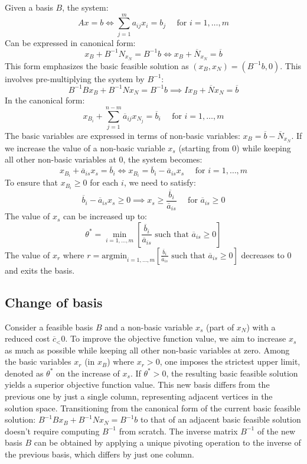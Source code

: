 Given a basis $B$, the system:
\[Ax=b \Leftrightarrow \sum_{j=1}^{m}a_{ij}x_i=b_j \:\:\:\:\:\: \text{for }i=1,\dots,m\]
Can be expressed in canonical form: 
\[x_B+B^{-1}N_{x_N}=B^{-1}b \Leftrightarrow x_B+\overline{N}_{x_N}=\overline{b}\]
This form emphasizes the basic feasible solution as $(x_B,x_N)=(B^{-1}b,0)$. 
This involves pre-multiplying the system by $B^{-1}$: 
\[B^{-1}Bx_B+B^{-1}Nx_N=B^{-1}b \implies Ix_B+\overline{N}x_N=\overline{b}\]
In the canonical form: 
\[x_{B_i}+\sum_{j=1}^{n-m}\overline{a}_{ij}x_{N_j}=\overline{b}_i \:\:\:\:\:\: \text{for }i=1,\dots,m\]
The basic variables are expressed in terms of non-basic variables: $x_B=\overline{b}-\overline{N}_{x_N}$. 
If we increase the value of a non-basic variable $x_s$ (starting from 0) while keeping all other non-basic variables at 0, the system becomes: 
\[x_{B_i}+\overline{a}_{is}x_s=\overline{b}_i \Leftrightarrow x_{B_i}=\overline{b}_i-\overline{a}_{is}x_s \:\:\:\:\:\: \text{for }i=1,\dots,m\]
To ensure that $x_{B_i} \geq 0$ for each $i$, we need to satisfy: 
\[\overline{b}_i-\overline{a}_{is}x_s \geq 0 \implies x_s \geq \dfrac{\overline{b}_i}{\overline{a}_{is}} \:\:\:\:\:\: \text{for }\overline{a}_{is} \geq 0\]
The value of $x_s$ can be increased up to: 
\[\theta^{\ast}=\min_{i=1,\dots,m}{\left[\dfrac{\overline{b}_i}{\overline{a}_{is}} \text{ such that }\overline{a}_{is} \geq 0\right]}\]
The value of $x_r$ where $r=\text{argmin}_{i=1,\dots,m}{\left[\frac{\overline{b}_i}{\overline{a}_{is}} \text{ such that }\overline{a}_{is} \geq 0\right]}$ decreases to 0 and exits the basis. 

\subsection{Change of basis}
Consider a feasible basis $B$ and a non-basic variable $x_s$ (part of $x_N$) with a reduced cost $\overline{c}_ < 0$.
To improve the objective function value, we aim to increase $x_s$ as much as possible while keeping all other non-basic variables at zero.
Among the basic variables $x_r$ (in $x_B$) where $x_r>0$, one imposes the strictest upper limit, denoted as $\theta^{\ast}$ on the increase of $x_s$.
If $\theta^{\ast} > 0$, the resulting basic feasible solution yields a superior objective function value.
This new basis differs from the previous one by just a single column, representing adjacent vertices in the solution space.
Transitioning from the canonical form of the current basic feasible solution:
$B^{-1}Bx_B+B^{-1}Nx_N=B^{-1}b$
to that of an adjacent basic feasible solution doesn't require computing $B^{-1}$ from scratch.
The inverse matrix $B^{-1}$ of the new basis $B$ can be obtained by applying a unique pivoting operation to the inverse of the previous basis, which differs by just one column.

